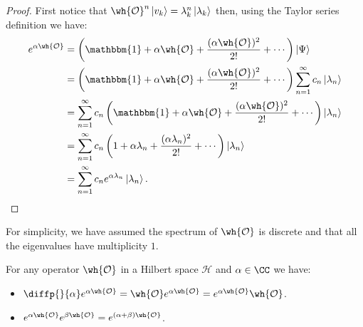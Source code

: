 \documentclass[12pt, a4paper]{article}
\begin{document}
\begin{proof}
    First notice that \(\wh{\mathcal{O}}^n \ket{v_k}= \lambda_k^n \ket{\lambda_k}\) then, using the Taylor series definition we have:
    \[\begin{aligned}
        e^{\alpha \wh{\mathcal{O}}} &= \left( \mathbbm{1}+\alpha \wh{\mathcal{O}} + \frac{(\alpha \wh{\mathcal{O}})^2}{2!} +\cdots \right)\ket{\Psi} \\
        &= \left( \mathbbm{1}+\alpha \wh{\mathcal{O}} + \frac{(\alpha \wh{\mathcal{O}})^2}{2!} +\cdots \right) \sum_{n=1}^{\infty} c_n \ket{\lambda_n} \\
        &= \sum_{n=1}^{\infty} c_n \left( \mathbbm{1}+\alpha \wh{\mathcal{O}} + \frac{(\alpha \wh{\mathcal{O}})^2}{2!} +\cdots \right) \ket{\lambda_n} \\
        &= \sum_{n=1}^{\infty} c_n \left( 1 +\alpha \lambda_n + \frac{(\alpha \lambda_n)^2}{2!} + \cdots \right) \ket{\lambda_n} \\
        &= \sum_{n=1}^{\infty} c_n e^{\alpha \lambda_n} \ket{\lambda_n}.
    \end{aligned}\]
\end{proof}

\begin{mdremark}
    For simplicity, we have assumed the spectrum of \(\wh{\mathcal{O}}\) is discrete and that all the eigenvalues have multiplicity \(1\).
\end{mdremark}

\begin{mdthm}
    For any operator \(\wh{\mathcal{O}}\) in a Hilbert space \(\mathcal{H}\) and \(\alpha \in \CC\) we have:
    \begin{itemize}
        \item \(\diffp{}{\alpha}e^{\alpha \wh{\mathcal{O}}}= \wh{\mathcal{O}}e^{\alpha \wh{\mathcal{O}}} = e^{\alpha \wh{\mathcal{O}}}\wh{\mathcal{O}}\).
        \item \(e^{\alpha \wh{\mathcal{O}}} e^{\beta \wh{\mathcal{O}}} = e^{(\alpha+\beta) \wh{\mathcal{O}}}\).
    \end{itemize}
\end{mdthm}
\end{document}
